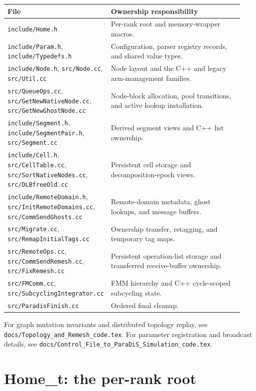 \documentclass[11pt]{article}
\newcommand{\srcfile}[1]{\texorpdfstring{\nolinkurl{#1}}{#1}}
\begin{document}
\begin{longtable}{@{}p{0.38\linewidth}p{0.56\linewidth}@{}}
\toprule
File & Ownership responsibility \\
\midrule
\endhead
\srcfile{include/Home.h} & Per-rank root and memory-wrapper macros. \\
\srcfile{include/Param.h}, \srcfile{include/Typedefs.h} & Configuration,
parser registry records, and shared value types. \\
\srcfile{include/Node.h}, \srcfile{src/Node.cc}, \srcfile{src/Util.cc} & Node
layout and the C++ and legacy arm-management families. \\
\srcfile{src/QueueOps.cc}, \srcfile{src/GetNewNativeNode.cc},
\srcfile{src/GetNewGhostNode.cc} & Node-block allocation, pool transitions,
and active lookup installation. \\
\srcfile{include/Segment.h}, \srcfile{include/SegmentPair.h},
\srcfile{src/Segment.cc} & Derived segment views and C++ list ownership. \\
\srcfile{include/Cell.h}, \srcfile{src/CellTable.cc},
\srcfile{src/SortNativeNodes.cc}, \srcfile{src/DLBfreeOld.cc} & Persistent
cell storage and decomposition-epoch views. \\
\srcfile{include/RemoteDomain.h}, \srcfile{src/InitRemoteDomains.cc},
\srcfile{src/CommSendGhosts.cc} & Remote-domain metadata, ghost lookups, and
message buffers. \\
\srcfile{src/Migrate.cc}, \srcfile{src/RemapInitialTags.cc} & Ownership
transfer, retagging, and temporary tag maps. \\
\srcfile{src/RemoteOps.cc}, \srcfile{src/CommSendRemesh.cc},
\srcfile{src/FixRemesh.cc} & Persistent operation-list storage and transferred
receive-buffer ownership. \\
\srcfile{src/FMComm.cc}, \srcfile{src/SubcyclingIntegrator.cc} & FMM hierarchy
and C++ cycle-scoped subcycling state. \\
\srcfile{src/ParadisFinish.cc} & Ordered final cleanup. \\
\bottomrule
\end{longtable}

For graph mutation invariants and distributed topology replay, see
\srcfile{docs/Topology_and_Remesh_code.tex}.  For parameter registration and
broadcast details, see \srcfile{docs/Control_File_to_ParaDiS_Simulation_code.tex}.

\section{Home\_t: the per-rank root}
\end{document}
